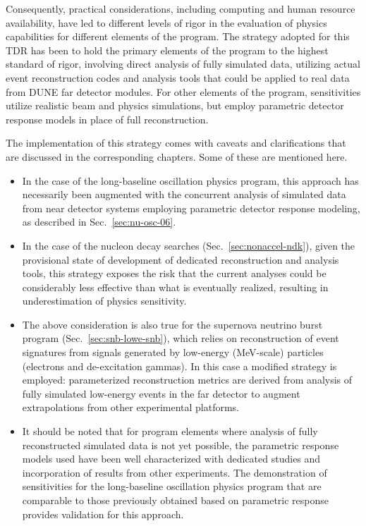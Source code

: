 Consequently, practical considerations, including computing
and human resource availability, have led to different levels
of rigor in the evaluation of physics capabilities for
different elements of the program.  The strategy adopted for
this TDR has been to hold the primary elements of the program
to the highest standard of rigor, involving direct analysis
of fully simulated data, utilizing actual event reconstruction
codes and analysis tools that could be applied to real data
from DUNE far detector modules.  For other elements of the
program, sensitivities utilize realistic beam and
physics simulations, but employ parametric detector
response models in place of full reconstruction.

The implementation of this strategy comes with caveats
and clarifications that are discussed in the corresponding
chapters.  Some of these are mentioned here.
\begin{itemize}
\item In the case of the long-baseline oscillation physics
      program, this approach has necessarily been augmented
      with the concurrent analysis of simulated data from
      near detector systems employing parametric
      detector response modeling, as described in
      Sec.~\ref{sec:nu-osc-06}.

\item In the case of the nucleon decay searches
      (Sec.~\ref{sec:nonaccel-ndk}),
      given the provisional state of development of dedicated
      reconstruction and analysis tools, this strategy exposes
      the risk that the current analyses could be considerably
      less effective than what is eventually realized,
      resulting in underestimation of physics sensitivity.

\item The above consideration is also true for the supernova
      neutrino burst program (Sec.~\ref{sec:snb-lowe-snb}),
      which relies on reconstruction of event signatures
      from \lartpc signals generated by low-energy
      (MeV-scale) particles (electrons and de-excitation gammas).
      In this case a modified strategy is employed:
      parameterized reconstruction metrics are derived from
      analysis of fully simulated low-energy events
      in the far detector to augment extrapolations
      from other experimental platforms.

\item It should be noted that for program elements where
      analysis of fully reconstructed simulated data is not
      yet possible, the parametric response models used have
      been well characterized with dedicated studies
      and incorporation of results from other experiments.
      The demonstration of sensitivities for the long-baseline
      oscillation physics program that are comparable to those
      previously obtained based on parametric response
      provides validation for this approach.
\end{itemize}


